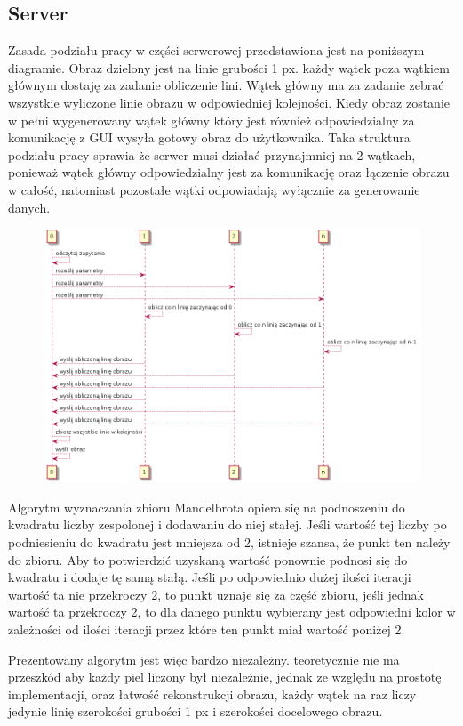 \subsection{Server}
Zasada podziału pracy w części serwerowej przedstawiona jest na poniższym diagramie.
Obraz dzielony jest na linie grubości 1 px. każdy wątek poza wątkiem głównym dostaję za zadanie obliczenie lini. Wątek główny ma za zadanie zebrać wszystkie wyliczone linie obrazu w odpowiedniej kolejności.
Kiedy obraz zostanie w pełni wygenerowany wątek główny który jest również odpowiedzialny za komunikację z GUI wysyła gotowy obraz do użytkownika.
Taka struktura podziału pracy sprawia że serwer musi działać przynajmniej na 2 wątkach, ponieważ wątek główny odpowiedzialny jest za komunikację oraz łączenie obrazu w całość, natomiast pozostałe wątki odpowiadają wyłącznie za generowanie danych.
\begin{figure}[H]
    \centering
    \includegraphics[width = \textwidth]{img/watki.png}
\end{figure}

Algorytm wyznaczania zbioru Mandelbrota opiera się na podnoszeniu do kwadratu liczby zespolonej i dodawaniu do niej stałej. Jeśli wartość tej liczby po podniesieniu do kwadratu jest mniejsza od 2, istnieje szansa, że punkt ten należy do zbioru. Aby to potwierdzić uzyskaną wartość ponownie podnosi się do kwadratu i dodaje tę samą stałą. Jeśli po odpowiednio dużej ilości iteracji wartość ta nie przekroczy 2, to punkt uznaje się za część zbioru, jeśli jednak wartość ta przekroczy 2, to dla danego punktu wybierany jest odpowiedni kolor w zależności od ilości iteracji przez które ten punkt miał wartość poniżej 2.

Prezentowany algorytm jest więc bardzo niezależny. teoretycznie nie ma przeszkód aby każdy piel liczony był niezależnie, jednak ze względu na prostotę implementacji, oraz łatwość rekonstrukcji obrazu, każdy wątek na raz liczy jedynie linię szerokości grubości 1 px i szerokości docelowego obrazu.

